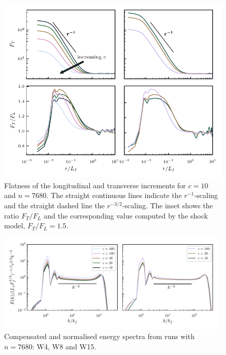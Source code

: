 \begin{figure}
\centerline{\includegraphics[width=12cm]{../Pyfig/fig_flatness}}
\caption{ Flatness of the longitudinal and transverse increments for
$c = 10$ and $n = 7680$. The straight continuous lines indicate the
$r^{-1}$-scaling and the straight dashed line the $r^{-3/2}$-scaling.
The inset shows the ratio $F_T/F_L$ and the corresponding value computed by the shock model, $F_T/F_L = 1.5$.  }
\label{fig_flatness}
\end{figure}

\begin{figure}
\centerline{\includegraphics[width=11cm]{../Pyfig/fig_spectra}}
\caption{Compensated and normalised energy spectra
from runs with $ n = 7680 $: W4, W8 and W15.}
\label{fig_spectra_c40}
\end{figure}


